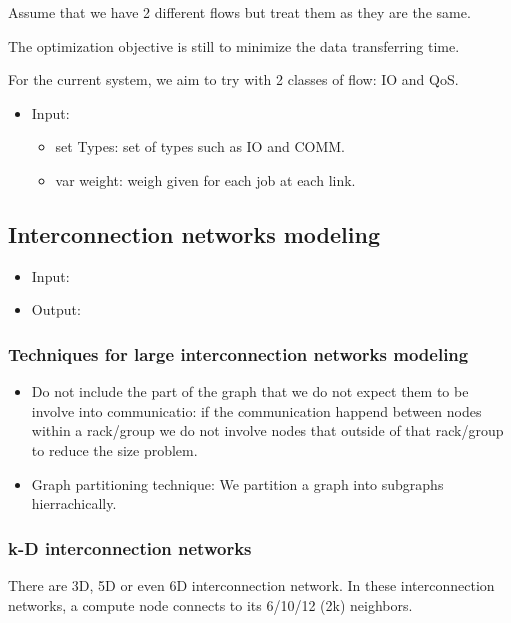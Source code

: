 \documentclass[letter]{article}
\begin{document}
\begin{itemize}
Assume that we have 2 different flows but treat them as they are the same. 

The optimization objective is still to minimize the data transferring time.

For the current system, we aim to try with 2 classes of flow: IO and QoS.
\begin{itemize}
\item Input:
\begin{itemize}
\item set Types: set of types such as IO and COMM.
\item var weight: weigh given for each job at each link.
\end{itemize}

\end{itemize}
\end{itemize}

\subsection {Interconnection networks modeling}
\begin{itemize}
\item Input:
\item Output:
\end{itemize}

\subsubsection{Techniques for large interconnection networks modeling}
\begin{itemize}
\item Do not include the part of the graph that we do not expect them to be involve into communicatio: if the communication happend between nodes within a rack/group we do not involve nodes that outside of that rack/group to reduce the size problem.
\item Graph partitioning technique: We partition a graph into subgraphs hierrachically.
\end{itemize}

\subsubsection{k-D interconnection networks}
There are 3D, 5D or even 6D interconnection network. In these interconnection networks, a compute node connects to its 6/10/12 (2k) neighbors. %
\end{document}
